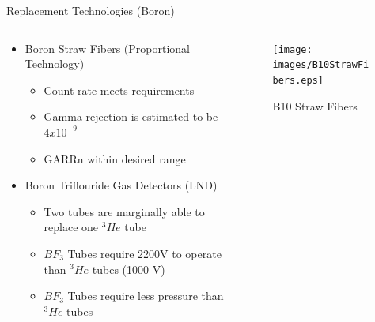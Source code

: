 \begin{frame}{Replacement Technologies (Boron)}
\begin{columns}[onlytextwidth]
\begin{column}{0.45\textwidth}
\begin{itemize}
	\small
	\item Boron Straw Fibers (Proportional Technology) \cite{kouzes_boron-lined_2012}
	\begin{itemize}
		\tiny
		\item Count rate meets requirements
		\item Gamma rejection is estimated to be $4x10^{-9}$
		\item GARRn within desired range
	\end{itemize}
	\small
	\item Boron Triflouride Gas Detectors (LND) \cite{kouzes_bf3_2009}
	\begin{itemize}
		\tiny
		\item Two tubes are marginally able to replace one ${}^3He$ tube
		\item $BF_3$ Tubes require 2200V to operate than ${}^3He$ tubes (1000 V)
		\item $BF_3$ Tubes require less pressure than ${}^3He$ tubes
	\end{itemize}
\end{itemize}
\end{column}
\begin{column}{0.45\textwidth}
	\begin{figure}
	\centering
		\texttt{[image: images/B10StrawFibers.eps]}
		\caption{B10 Straw Fibers}
		\label{fig:B10StrawFibers}

\end{figure}
\end{column}
\end{columns}
\end{frame}
